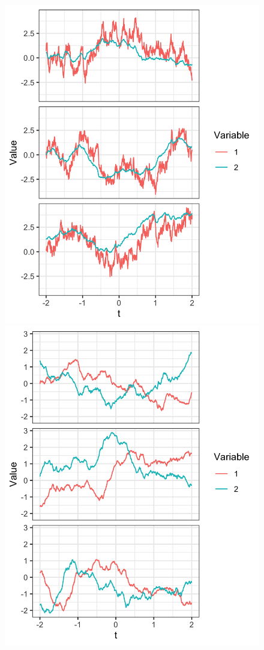 \documentclass[11pt]{article}
\begin{document}
\begin{figure}
\centering
\includegraphics[scale = .15]{../example_simulation.png}
\includegraphics[scale = .15]{../example_simulation_asymm.png}

\end{figure}
\end{document}
